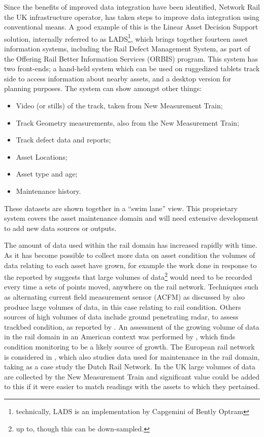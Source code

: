 Since the benefits of improved data integration have been identified, Network Rail the UK infrastructure operator, has taken steps to improve data integration using conventional means. A good example of this is the Linear Asset Decision Support solution, internally referred to as LADS\footnote{technically, LADS is an implementation by Capgemini of Bently Optram}, which brings together fourteen asset information systems, including the Rail Defect Management System, as part of the Offering Rail Better Information Services (ORBIS) program. This system has two front-ends; a hand-held system which can be used on ruggedized tablets track side to access information about nearby assets, and a desktop version for planning purposes. The system can show amongst other things:
\begin{itemize}
    \item Video (or stills) of the track, taken from New Measurement Train;
    \item Track Geometry measurements, also from the New Measurement Train;
    \item Track defect data and reports;
    \item Asset Locations;
    \item Asset type and age;
    \item Maintenance history.  
\end{itemize} 
These datasets are shown together in a ``swim lane'' view. This proprietary system covers the asset maintenance domain and will need extensive development to add new data sources or outputs. 
 
The amount of data used within the rail domain has increased rapidly with time. As it has become possible to collect more data on asset condition the volumes of data relating to each asset have grown, for example the work done in response to the  reported by \citet{Tutcher2015a} suggests that large volumes of data\footnote{up to, though this can be down-sampled.} would need to be recorded every time a sets of points moved, anywhere on the rail network. Techniques such as alternating current field measurement sensor (ACFM) as discussed by \citet{Rowshandel2013} also produce large volumes of data, in this case relating to rail condition. Others sources of high volumes of data include ground penetrating radar, to assess trackbed condition, as reported by \citet{eriksen2004improved}. An assessment of the growing volume of data in the rail domain in an American context was performed by \citet{Zarembski}, which finds condition monitoring to be a likely source of growth. The European rail network is considered in \citet{Nunez2014}, which also studies data used for maintenance in the rail domain, taking as a case study the Dutch Rail Network. In the UK large volumes of  data are collected by the New Measurement Train and significant value could be added to this if it were easier to match readings with the assets to which they pertained.

